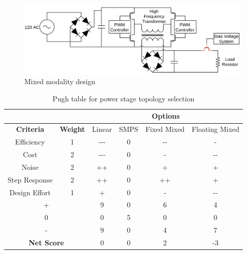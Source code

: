 \documentclass[12pt]{article}
\begin{document}
\begin{figure}[H]
    \includegraphics[width=\textwidth]{mixed}
    \caption{Mixed modality design}
    \label{fig:mixed}
\end{figure}
\begin{table}[H]
    \centering
\begin{tabular}{ |c|c||c|c|c|c|  }
    \cline{3-6}
    \multicolumn{1}{c}{}& \multicolumn{1}{c}{}&  \multicolumn{4}{|c|}{\textbf{Options}} \\
    \hline
    \textbf{Criteria} & \textbf{Weight} & Linear & SMPS & Fixed Mixed & Floating Mixed \\ 
    \hline
    Efficiency & 1 & {-}{-}{-} & 0 & {-}{-} & - \\
    Cost & 2 & {-}{-}{-} & 0 & {-} & {-}{-} \\
    Noise & 2 & ++ & 0 & + & + \\
    Step Response & 2 & ++ & 0 & ++ & + \\
    Design Effort & 1 & + & 0 & - & {-}{-} \\ 
    \hline
    \hline
    \multicolumn{2}{|c||}{+} & 9 & 0 & 6 & 4\\
    \multicolumn{2}{|c||}{0} & 0 & 5 & 0 & 0\\
    \multicolumn{2}{|c||}{-} & 9 & 0 & 4 & 7\\
    \hline
    \hline
    \multicolumn{2}{|c||}{\textbf{Net Score}} & 0 & 0 & 2 & -3\\
    \hline
\end{tabular}
\caption{Pugh table for power stage topology selection}
\label{tab:power}
\end{table}
\end{document}
